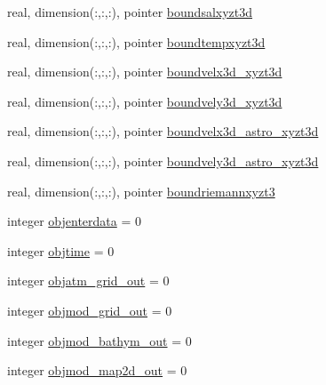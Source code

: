 \begin{DoxyCompactItemize}
\item 
real, dimension(\+:,\+:,\+:), pointer \mbox{\hyperlink{structmoduledelft3d__2__mohid_1_1t__delft3d__2__mohid_a43da59ce730dca8ba3f5683a67f7b34a}{boundsalxyzt3d}}
\item 
real, dimension(\+:,\+:,\+:), pointer \mbox{\hyperlink{structmoduledelft3d__2__mohid_1_1t__delft3d__2__mohid_a1e9ae59230834b5c93cadb6c32e3f404}{boundtempxyzt3d}}
\item 
real, dimension(\+:,\+:,\+:), pointer \mbox{\hyperlink{structmoduledelft3d__2__mohid_1_1t__delft3d__2__mohid_a50af9b203ec5a6c5278b39fb95501ca7}{boundvelx3d\+\_\+xyzt3d}}
\item 
real, dimension(\+:,\+:,\+:), pointer \mbox{\hyperlink{structmoduledelft3d__2__mohid_1_1t__delft3d__2__mohid_ab948754cd899f0ef6e932f909d8c9524}{boundvely3d\+\_\+xyzt3d}}
\item 
real, dimension(\+:,\+:,\+:), pointer \mbox{\hyperlink{structmoduledelft3d__2__mohid_1_1t__delft3d__2__mohid_accb882fbd5ba9adfd342ed2c92696a4e}{boundvelx3d\+\_\+astro\+\_\+xyzt3d}}
\item 
real, dimension(\+:,\+:,\+:), pointer \mbox{\hyperlink{structmoduledelft3d__2__mohid_1_1t__delft3d__2__mohid_a5b571233ec465e2550cd85d89c394a13}{boundvely3d\+\_\+astro\+\_\+xyzt3d}}
\item 
real, dimension(\+:,\+:,\+:), pointer \mbox{\hyperlink{structmoduledelft3d__2__mohid_1_1t__delft3d__2__mohid_a0cff23b62776886142d35bdb48d10725}{boundriemannxyzt3}}
\item 
integer \mbox{\hyperlink{structmoduledelft3d__2__mohid_1_1t__delft3d__2__mohid_ac44be5743d2dfe65cabf66c22428b638}{objenterdata}} = 0
\item 
integer \mbox{\hyperlink{structmoduledelft3d__2__mohid_1_1t__delft3d__2__mohid_a6420e3f45d4d3bb2d03ff10dfff268ac}{objtime}} = 0
\item 
integer \mbox{\hyperlink{structmoduledelft3d__2__mohid_1_1t__delft3d__2__mohid_a22abff0bee4cdf0dd5ac312ca0749310}{objatm\+\_\+grid\+\_\+out}} = 0
\item 
integer \mbox{\hyperlink{structmoduledelft3d__2__mohid_1_1t__delft3d__2__mohid_aeb17e4de82dfdef052d5baf5496d8e3e}{objmod\+\_\+grid\+\_\+out}} = 0
\item 
integer \mbox{\hyperlink{structmoduledelft3d__2__mohid_1_1t__delft3d__2__mohid_a018f8e78205b25e4695686a9d4e837dd}{objmod\+\_\+bathym\+\_\+out}} = 0
\item 
integer \mbox{\hyperlink{structmoduledelft3d__2__mohid_1_1t__delft3d__2__mohid_a59f0a61309a8f570349e20e844879e5f}{objmod\+\_\+map2d\+\_\+out}} = 0

\end{DoxyCompactItemize}
